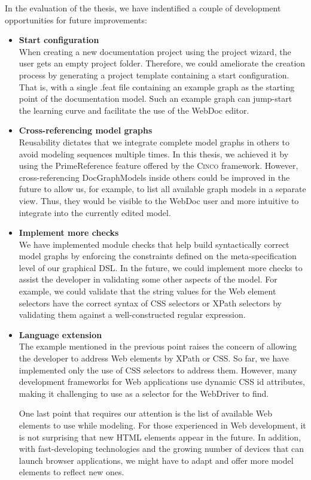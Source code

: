 In the evaluation of the thesis, we have indentified a couple of development opportunities for future improvements:
\begin{itemize}
    \item \textbf{Start configuration}\\
        When creating a new documentation project using the project wizard, the user gets an empty project folder. Therefore, we could ameliorate the creation process by generating a project template containing a start configuration. That is, with a single .feat file containing an example graph as the starting point of the documentation model. Such an example graph can jump-start the learning curve and facilitate the use of the WebDoc editor.
    \item \textbf{Cross-referencing model graphs}\\
        Reusability dictates that we integrate complete model graphs in others to avoid modeling sequences multiple times. In this thesis, we achieved it by using the PrimeReference feature offered by the \textsc{Cinco} framework. However, cross-referencing DocGraphModels inside others could be improved in the future to allow us, for example, to list all available graph models in a separate view. Thus, they would be visible to the WebDoc user and more intuitive to integrate into the currently edited model.
    \item \textbf{Implement more checks}\\
        We have implemented module checks that help build syntactically correct model graphs by enforcing the constraints defined on the meta-specification level of our graphical DSL. In the future, we could implement more checks to assist the developer in validating some other aspects of the model. For example, we could validate that the string values for the Web element selectors have the correct syntax of CSS selectors or XPath selectors by validating them against a well-constructed regular expression.
    \item \textbf{Language extension}\\
        The example mentioned in the previous point raises the concern of allowing the developer to address Web elements by XPath or CSS. So far, we have implemented only the use of CSS selectors to address them. However, many development frameworks for Web applications use dynamic CSS id attributes, making it challenging to use as a selector for the WebDriver to find. 

        One last point that requires our attention is the list of available Web elements to use while modeling. For those experienced in Web development, it is not surprising that new HTML elements appear in the future. In addition, with fast-developing technologies and the growing number of devices that can launch browser applications, we might have to adapt and offer more model elements to reflect new ones.
\end{itemize}
